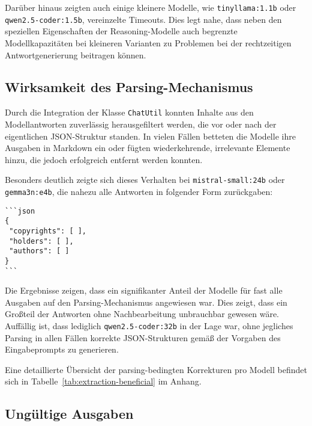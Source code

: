 Darüber hinaus zeigten auch einige kleinere Modelle, wie \texttt{tinyllama:1.1b} oder \texttt{qwen2.5-coder:1.5b}, vereinzelte Timeouts.
Dies legt nahe, dass neben den speziellen Eigenschaften der Reasoning-Modelle auch begrenzte Modellkapazitäten bei kleineren Varianten zu Problemen bei der rechtzeitigen Antwortgenerierung beitragen können.


\subsection{Wirksamkeit des Parsing-Mechanismus}

Durch die Integration der Klasse \texttt{ChatUtil} konnten Inhalte aus den Modellantworten zuverlässig herausgefiltert werden, die vor oder nach der eigentlichen JSON-Struktur standen.
In vielen Fällen betteten die Modelle ihre Ausgaben in Markdown ein oder fügten wiederkehrende, irrelevante Elemente hinzu, die jedoch erfolgreich entfernt werden konnten.

Besonders deutlich zeigte sich dieses Verhalten bei \texttt{mistral-small:24b} oder \texttt{gemma3n:e4b}, die nahezu alle Antworten in folgender Form zurückgaben:

\begin{lstlisting}[keepspaces=true]
```json
{
 "copyrights": [ ],
 "holders": [ ],
 "authors": [ ]
}
```
\end{lstlisting}


Die Ergebnisse zeigen, dass ein signifikanter Anteil der Modelle für fast alle Ausgaben auf den Parsing-Mechanismus angewiesen war.
Dies zeigt, dass ein Großteil der Antworten ohne Nachbearbeitung unbrauchbar gewesen wäre.
Auffällig ist, dass lediglich \texttt{qwen2.5-coder:32b} in der Lage war, ohne jegliches Parsing in allen Fällen korrekte JSON-Strukturen gemäß der Vorgaben des Eingabeprompts zu generieren.

Eine detaillierte Übersicht der parsing-bedingten Korrekturen pro Modell befindet sich in Tabelle~\ref{tab:extraction-beneficial} im Anhang.


\subsection{Ungültige Ausgaben}

